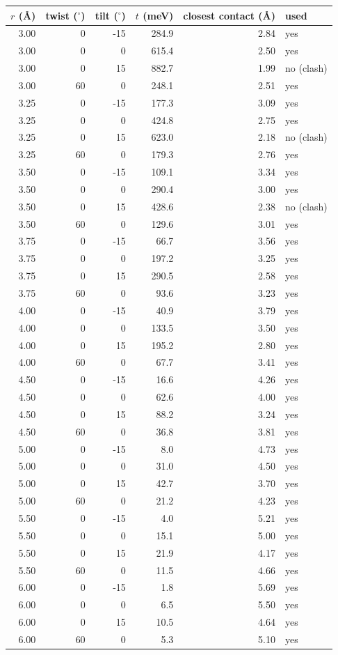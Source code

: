 \begin{tabular}{rrrrrl}
\toprule
$r$ (\AA) & twist ($^\circ$) & tilt ($^\circ$) & $t$ (meV) & closest contact (\AA) & used \\
\midrule
3.00 & 0 & -15 & 284.9 & 2.84 & yes \\
3.00 & 0 & 0 & 615.4 & 2.50 & yes \\
3.00 & 0 & 15 & 882.7 & 1.99 & no (clash) \\
3.00 & 60 & 0 & 248.1 & 2.51 & yes \\
3.25 & 0 & -15 & 177.3 & 3.09 & yes \\
3.25 & 0 & 0 & 424.8 & 2.75 & yes \\
3.25 & 0 & 15 & 623.0 & 2.18 & no (clash) \\
3.25 & 60 & 0 & 179.3 & 2.76 & yes \\
3.50 & 0 & -15 & 109.1 & 3.34 & yes \\
3.50 & 0 & 0 & 290.4 & 3.00 & yes \\
3.50 & 0 & 15 & 428.6 & 2.38 & no (clash) \\
3.50 & 60 & 0 & 129.6 & 3.01 & yes \\
3.75 & 0 & -15 & 66.7 & 3.56 & yes \\
3.75 & 0 & 0 & 197.2 & 3.25 & yes \\
3.75 & 0 & 15 & 290.5 & 2.58 & yes \\
3.75 & 60 & 0 & 93.6 & 3.23 & yes \\
4.00 & 0 & -15 & 40.9 & 3.79 & yes \\
4.00 & 0 & 0 & 133.5 & 3.50 & yes \\
4.00 & 0 & 15 & 195.2 & 2.80 & yes \\
4.00 & 60 & 0 & 67.7 & 3.41 & yes \\
4.50 & 0 & -15 & 16.6 & 4.26 & yes \\
4.50 & 0 & 0 & 62.6 & 4.00 & yes \\
4.50 & 0 & 15 & 88.2 & 3.24 & yes \\
4.50 & 60 & 0 & 36.8 & 3.81 & yes \\
5.00 & 0 & -15 & 8.0 & 4.73 & yes \\
5.00 & 0 & 0 & 31.0 & 4.50 & yes \\
5.00 & 0 & 15 & 42.7 & 3.70 & yes \\
5.00 & 60 & 0 & 21.2 & 4.23 & yes \\
5.50 & 0 & -15 & 4.0 & 5.21 & yes \\
5.50 & 0 & 0 & 15.1 & 5.00 & yes \\
5.50 & 0 & 15 & 21.9 & 4.17 & yes \\
5.50 & 60 & 0 & 11.5 & 4.66 & yes \\
6.00 & 0 & -15 & 1.8 & 5.69 & yes \\
6.00 & 0 & 0 & 6.5 & 5.50 & yes \\
6.00 & 0 & 15 & 10.5 & 4.64 & yes \\
6.00 & 60 & 0 & 5.3 & 5.10 & yes \\
\bottomrule
\end{tabular}
